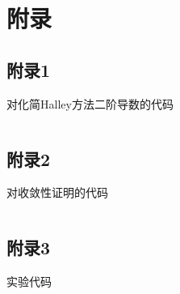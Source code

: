 
\section*{附录}

\subsection*{附录1}\label{sec:app1}

对化简Halley方法二阶导数的代码

\inputminted[linenos]{python}{code/simplify-halley.py}

\subsection*{附录2}\label{sec:app2}

对收敛性证明的代码

\inputminted[linenos]{python}{code/convergence.py}


\subsection*{附录3}\label{sec:app3}

实验代码

\inputminted[linenos]{python}{code/compute.py}

